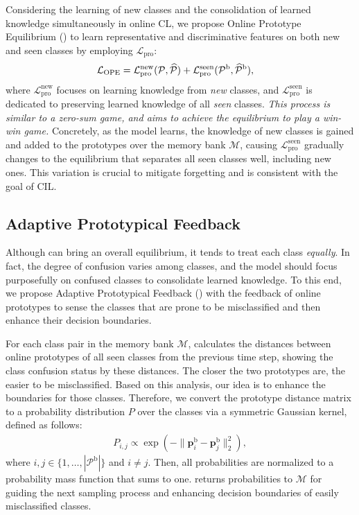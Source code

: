 Considering the learning of new classes and the consolidation of learned knowledge simultaneously in online CL, we propose Online Prototype Equilibrium (\methodname) to 
learn representative and discriminative features on both new and seen classes by employing $\mathcal{L}_{\mathrm{pro}}$:
\begin{equation}
    \begin{aligned}
    \mathcal{L}_{\mathrm{OPE}}
    &=
    \mathcal{L}^{\mathrm{new}}_{\mathrm{pro}}(\mathcal{P},\widehat{\mathcal{P}}) + \mathcal{L}^{\mathrm{seen}}_{\mathrm{pro}}(\mathcal{P}^\mathrm{b},\widehat{\mathcal{P}}^\mathrm{b}),
    \end{aligned}
\end{equation}
where
$\mathcal{L}^{\mathrm{new}}_{\mathrm{pro}}$ focuses on learning knowledge from \emph{new} classes, and $\mathcal{L}^{\mathrm{seen}}_{\mathrm{pro}}$ is dedicated to preserving learned knowledge of all \emph{seen} classes.
\textit{This process is similar to a zero-sum game, 
and \methodname aims to achieve the equilibrium to play a win-win game.}
Concretely,
as the model learns, the knowledge of new classes is gained and added to the prototypes over the memory bank $\mathcal{M}$, causing $\mathcal{L}^{\mathrm{seen}}_{\mathrm{pro}}$ gradually changes to the equilibrium that separates all seen classes well, including new ones. 
This variation is crucial to mitigate forgetting and is consistent with the goal of CIL.



\subsection{Adaptive Prototypical Feedback} 
Although \methodname can bring an overall equilibrium, it tends to treat each class \emph{equally}. 
In fact, the degree of confusion varies among classes, 
and the model should focus purposefully on confused classes to consolidate learned knowledge. 
To this end, we propose Adaptive Prototypical Feedback (\dataaugname) with the feedback of online prototypes to sense the classes that are prone to be misclassified and then enhance their decision boundaries.
 
For each class pair in the memory bank $\mathcal{M}$, \dataaugname calculates the distances between online prototypes of all seen classes from the previous time step, showing the class confusion status by these distances. The closer the two prototypes are, the easier to be misclassified. 
Based on this analysis, 
our idea is to enhance the boundaries for those classes. Therefore, we convert the prototype distance matrix to a probability distribution $P$ over the classes via a symmetric Gaussian kernel, defined as follows:
\begin{align}
\label{eq:cal_d}
    P_{i, j} \propto \exp (-\| \mathbf{p}_i^\mathrm{b} - \mathbf{p}_j^\mathrm{b} \|_2^2),
\end{align}
where $i,j \in \{ 1, \ldots, |\mathcal{P}^\mathrm{b}| \}$ and $i \neq j$. 
Then, 
all probabilities are normalized to a probability mass function that sums to one.
\dataaugname returns probabilities to $\mathcal{M}$ for guiding the next sampling process and enhancing decision boundaries of easily misclassified classes. 


